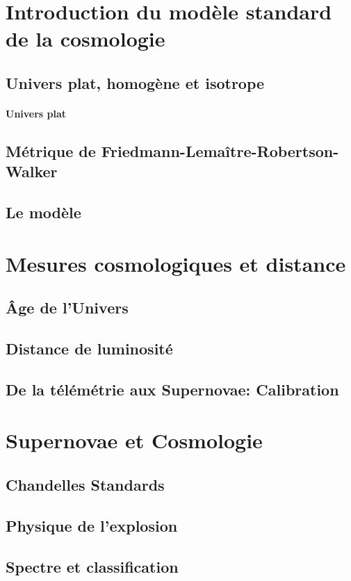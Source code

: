 \documentclass[../main/main.tex]{subfiles}
\begin{document}
\section{Introduction du modèle standard de la cosmologie}\label{sec:MS}

\subsection{Univers plat, homogène et isotrope}\label{ssec:plat}

\paragraph*{Univers plat}
\lipsum[1]

\subsection{Métrique de Friedmann-Lemaître-Robertson-Walker}\label{ssec:FLRW}

\subsection{Le modèle \lcdm}\label{ssec:LCDM}

\section{Mesures cosmologiques et distance}\label{sec:dist}

\subsection{Âge de l'Univers}\label{ssec:age}

\subsection{Distance de luminosité}\label{ssec:dl}

\subsection{De la télémétrie aux Supernovae: Calibration}\label{ssec:teltosn}

\section{Supernovae et Cosmologie}\label{sec:snia}

\subsection{Chandelles Standards}
\subsection{Physique de l'explosion}
\subsection{Spectre et classification}\label{ssec:class}
\lipsum[2-4]
\end{document}
